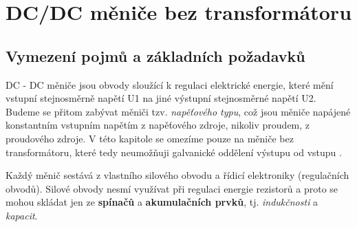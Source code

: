   \section{DC/DC měniče bez transformátoru}\label{ENZ:kap_DC_DC}
    \subsection{Vymezení pojmů a základních požadavků}
      DC - DC měniče jsou obvody sloužící k regulaci elektrické energie, které mění vstupní
      stejnosměrně napětí U1 na jiné výstupní stejnosměrné napětí U2. Budeme se přitom zabývat
      měniči tzv. \emph{napěťového typu}, což jsou měniče napájené konstantním vstupním napětím z
      napěťového zdroje, nikoliv proudem, z proudového zdroje. V této kapitole se omezíme pouze na
      měniče bez transformátoru, které tedy neumožňuji galvanické oddělení výstupu od vstupu
      \cite{Patocka}.

      Každý měnič sestává z vlastního silového obvodu a řídicí elektroniky (regulačních obvodů).
      Silové obvody nesmí využívat při regulaci energie rezistorů a proto se mohou skládat jen ze
      \textbf{spínačů} a \textbf{akumulačních prvků}, tj. \emph{indukčnosti} a \emph{kapacit}.

